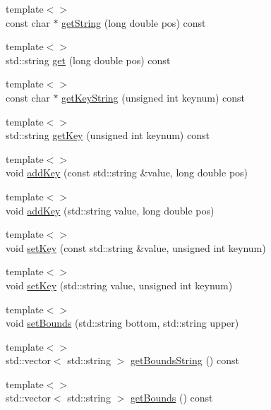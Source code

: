\begin{DoxyCompactItemize}
\item 
{\footnotesize template$<$$>$ }\\const char $\ast$ \hyperlink{classmaudio_1_1SimpleKeyableProperty_ad65745f7a5dae9883621c385c87591fb}{get\-String} (long double pos) const
\item 
{\footnotesize template$<$$>$ }\\std\-::string \hyperlink{classmaudio_1_1SimpleKeyableProperty_ae7cb5d3b99c238d7d1b977c7e2a43774}{get} (long double pos) const
\item 
{\footnotesize template$<$$>$ }\\const char $\ast$ \hyperlink{classmaudio_1_1SimpleKeyableProperty_ac8459aea6d5685fa2a808ab7f13c4051}{get\-Key\-String} (unsigned int keynum) const
\item 
{\footnotesize template$<$$>$ }\\std\-::string \hyperlink{classmaudio_1_1SimpleKeyableProperty_a06900c85a334eb5770085a4758ad0711}{get\-Key} (unsigned int keynum) const
\item 
{\footnotesize template$<$$>$ }\\void \hyperlink{classmaudio_1_1SimpleKeyableProperty_aeb558a531fad8b7a997f3425be7a5b98}{add\-Key} (const std\-::string \&value, long double pos)
\item 
{\footnotesize template$<$$>$ }\\void \hyperlink{classmaudio_1_1SimpleKeyableProperty_adcc2030105e800fc71d1a25374b58554}{add\-Key} (std\-::string value, long double pos)
\item 
{\footnotesize template$<$$>$ }\\void \hyperlink{classmaudio_1_1SimpleKeyableProperty_a4031c824079fd6e619784324fa71528d}{set\-Key} (const std\-::string \&value, unsigned int keynum)
\item 
{\footnotesize template$<$$>$ }\\void \hyperlink{classmaudio_1_1SimpleKeyableProperty_a63cfcf99306b4e189556ed1f428a187c}{set\-Key} (std\-::string value, unsigned int keynum)
\item 
{\footnotesize template$<$$>$ }\\void \hyperlink{classmaudio_1_1SimpleKeyableProperty_af72906ce2cdfacbbae8cff72ae450e5a}{set\-Bounds} (std\-::string bottom, std\-::string upper)
\item 
{\footnotesize template$<$$>$ }\\std\-::vector$<$ std\-::string $>$ \hyperlink{classmaudio_1_1SimpleKeyableProperty_af442b75407c7a82f18faa1b552f2cb79}{get\-Bounds\-String} () const
\item 
{\footnotesize template$<$$>$ }\\std\-::vector$<$ std\-::string $>$ \hyperlink{classmaudio_1_1SimpleKeyableProperty_ad75a850801bc9ac0cba85ca619b8324f}{get\-Bounds} () const
\end{DoxyCompactItemize}


